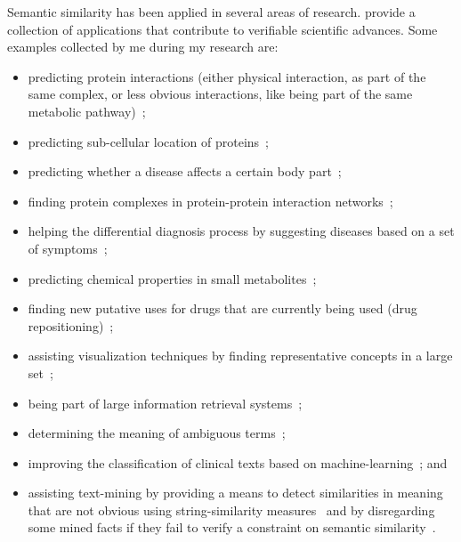 Semantic similarity has been applied in several areas of research. \citet{Hoehndorf2013} provide a collection of applications that contribute to verifiable scientific advances. Some examples collected by me during my research are:
\begin{itemize}
    \item predicting protein interactions (either physical interaction, as part of the same complex, or less obvious interactions, like being part of the same metabolic pathway)~\citep{Azuaje2004,Guo2006,Wu2006};
    \item predicting sub-cellular location of proteins~\citep{Lei2006};
    \item predicting whether a disease affects a certain body part~\citep{Ferreira2011};
    \item finding protein complexes in protein-protein interaction networks~\citep{Li2010b};
    \item helping the differential diagnosis process by suggesting diseases based on a set of symptoms~\citep{Kohler2009};
    \item predicting chemical properties in small metabolites~\citep{Ferreira2010};
    \item finding new putative uses for drugs that are currently being used (drug repositioning)~\citep{Tan2014};
    \item assisting visualization techniques by finding representative concepts in a large set~\citep{Supek2011};
    \item being part of large information retrieval systems~\citep{Emadzadeh2014};
    \item determining the meaning of ambiguous terms~\citep{McInnes2011,Hu2012,Goeg2014};
    \item improving the classification of clinical texts based on machine-learning~\citep{Garla2012a}; and
    \item assisting text-mining by providing a means to detect similarities in meaning that are not obvious using string-similarity measures~\citep{Spasic2005,Varelas2005} and by disregarding some mined facts if they fail to verify a constraint on semantic similarity~\citep{Lamurias2015}.
\end{itemize}


